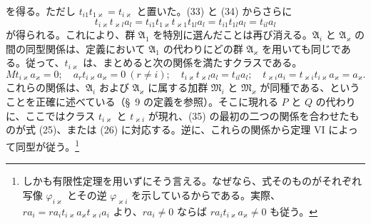 \documentclass[11pt]{article}
\begin{document}
を得る。ただし $t_{i1}t_{1\varkappa}=t_{i\varkappa}$ と置いた。(33) と (34) からさらに
\[
 t_{i\varkappa}t_{\varkappa l}a_l=t_{i1}t_{1\varkappa}t_{\varkappa1}t_{1l}a_l
 =t_{i1}t_{1l}a_l=t_{il}a_l
\]
が得られる。これにより、群 $\mathfrak A_1$ を特別に選んだことは再び消える。$\mathfrak A_i$ と $\mathfrak A_\varkappa$ の間の同型関係は、定義において $\mathfrak A_1$ の代わりにどの群 $\mathfrak A_\varkappa$ を用いても同じである。従って、$t_{i\varkappa}$ は、まとめると次の関係を満たすクラスである。
\begin{equation}
 Mt_{i\varkappa}a_\varkappa=0;
 \quad a_rt_{i\varkappa}a_\varkappa=0\ (r\ne i);
 \quad t_{i\varkappa}t_{\varkappa l}a_l=t_{il}a_l;
 \quad t_{\varkappa i}a_i=t_{\varkappa i}t_{i\varkappa}a_\varkappa=a_\varkappa.
\tag{35}
\end{equation}
これらの関係は、$\mathfrak A_i$ および $\mathfrak A_\varkappa$ に属する加群 $\mathfrak M_i$ と $\mathfrak M_\varkappa$ が同種である、ということを正確に述べている（\S~9 の定義を参照）。そこに現れる $P$ と $Q$ の代わりに、ここではクラス $t_{i\varkappa}$ と $t_{\varkappa i}$ が現れ、(35) の最初の二つの関係を合わせたものが式 (25)、または (26) に対応する。逆に、これらの関係から定理 VI によって同型が従う。\footnote{しかも有限性定理を用いずにそう言える。なぜなら、式そのものがそれぞれ写像 $\varphi_{i\varkappa}$ とその逆 $\varphi_{\varkappa i}$ を示しているからである。実際、$ra_i=ra_it_{i\varkappa}a_\varkappa t_{\varkappa i}a_i$ より、$ra_i\ne0$ ならば $ra_it_{i\varkappa}a_\varkappa\ne0$ も従う。}
\end{document}
